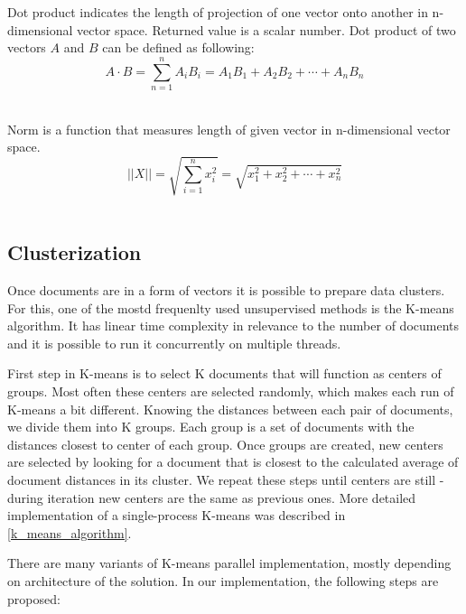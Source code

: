  \begin{definition} \label{def_dot_product}
 	Dot product indicates the length of projection of one vector onto another in n-dimensional vector space. Returned value is a scalar number. Dot product of two vectors \(A\) and \(B\) can be defined as following:
 	\[A \cdot B = \sum_{n=1}^{n} A_i B_i = A_1 B_1 + A_2 B_2 + \cdots + A_n B_n \]\\
 \end{definition}
 
 \begin{definition} \label{def_euclidean_norm}
 	Norm is a function that measures length of given vector in n-dimensional vector space. 
 	\[ ||X|| = \sqrt{\sum_{i=1}^{n}x_i^2} = \sqrt{x_1^2 + x_2^2 + \cdots + x_n^2} \]\\
 \end{definition}

\subsection{Clusterization}
Once documents are in a form of vectors it is possible to prepare data clusters. For this, one of the mostd frequenlty used unsupervised methods is the K-means algorithm. It has linear time complexity in relevance to the number of documents and it is possible to run it concurrently on multiple threads. 

First step in K-means is to select K documents that will function as centers of groups. Most often these centers are selected randomly, which makes each run of K-means a bit different.
Knowing the distances between each pair of documents, we divide them into K groups. Each group is a set of documents with the distances closest to center of each group. Once groups are created, new centers are selected by looking for a document that is closest to the calculated average of document distances in its cluster. We repeat these steps until centers are still - during iteration new centers are the same as previous ones. 
More detailed implementation of a single-process K-means was described in \ref{k_means_algorithm}.

There are many variants of K-means parallel implementation, mostly depending on architecture of the solution. In our implementation, the following steps are proposed:

